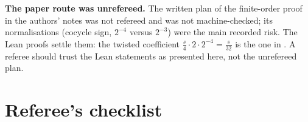 \begin{warning}
\textbf{The paper route was unrefereed.}  The written plan of the finite-order proof
in the authors' notes was not refereed and was not machine-checked; its normalisations (cocycle sign, $2^{-4}$ versus $2^{-3}$) were the main recorded risk.  The Lean proofs settle them:
the twisted coefficient $\tfrac s4\cdot2\cdot2^{-4}=\tfrac s{32}$ is the one in .  A referee should
trust the Lean statements as presented here, not the unrefereed plan.
\end{warning}

\section{Referee's checklist}\label{ch20:sec:checklist}

